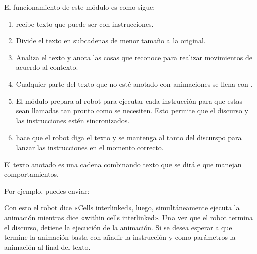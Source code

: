 El funcionamiento de este módulo es como sigue:
\begin{enumerate}
\item {} 
 recibe texto que puede ser  con instrucciones.

\item {} 
Divide el texto en subcadenas de menor tamaño a la original.

\item {} 
Analiza el texto y anota las cosas que reconoce para realizar movimientos de acuerdo al contexto.

\item {} 
Cualquier parte del texto que no esté anotado con animaciones se llena con .

\item {} 
El módulo prepara al robot para ejecutar cada instrucción para que estas sean llamadas tan pronto como se necesiten. Esto permite que el discurso y las instrucciones estén sincronizados.

\item {} 
 hace que el robot diga el texto y se mantenga al tanto del discurspo para lanzar las instrucciones en el momento correcto.

\end{enumerate}

El texto anotado es una cadena combinando texto que se dirá e 
que manejan comportamientos.

Por ejemplo, puedes enviar:

\begin{sphinxVerbatim}[commandchars=\\\{\}]
\end{sphinxVerbatim}

Con esto el robot dice «Cells interlinked», luego, simultáneamente ejecuta la
animación  mientras dice «within cells interlinked».
Una vez que el robot termina el discurso, detiene la ejecución de la animación.
Si se desea esperar a que termine la animación basta con añadir la instrucción
 y como parámetros la animación al final del texto.

